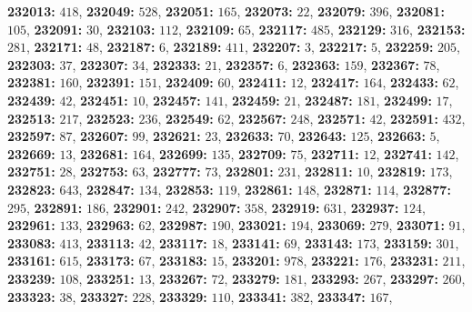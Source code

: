 \textsf{\bfseries 232013:} $418$, \textsf{\bfseries 232049:} $528$, \textsf{\bfseries 232051:} $165$, \textsf{\bfseries 232073:} $22$, \textsf{\bfseries 232079:} $396$, \textsf{\bfseries 232081:} $105$, \textsf{\bfseries 232091:} $30$, \textsf{\bfseries 232103:} $112$, \textsf{\bfseries 232109:} $65$, \textsf{\bfseries 232117:} $485$, \textsf{\bfseries 232129:} $316$, \textsf{\bfseries 232153:} $281$, \textsf{\bfseries 232171:} $48$, \textsf{\bfseries 232187:} $6$, \textsf{\bfseries 232189:} $411$, \textsf{\bfseries 232207:} $3$, \textsf{\bfseries 232217:} $5$, \textsf{\bfseries 232259:} $205$, \textsf{\bfseries 232303:} $37$, \textsf{\bfseries 232307:} $34$, \textsf{\bfseries 232333:} $21$, \textsf{\bfseries 232357:} $6$, \textsf{\bfseries 232363:} $159$, \textsf{\bfseries 232367:} $78$, \textsf{\bfseries 232381:} $160$, \textsf{\bfseries 232391:} $151$, \textsf{\bfseries 232409:} $60$, \textsf{\bfseries 232411:} $12$, \textsf{\bfseries 232417:} $164$, \textsf{\bfseries 232433:} $62$, \textsf{\bfseries 232439:} $42$, \textsf{\bfseries 232451:} $10$, \textsf{\bfseries 232457:} $141$, \textsf{\bfseries 232459:} $21$, \textsf{\bfseries 232487:} $181$, \textsf{\bfseries 232499:} $17$, \textsf{\bfseries 232513:} $217$, \textsf{\bfseries 232523:} $236$, \textsf{\bfseries 232549:} $62$, \textsf{\bfseries 232567:} $248$, \textsf{\bfseries 232571:} $42$, \textsf{\bfseries 232591:} $432$, \textsf{\bfseries 232597:} $87$, \textsf{\bfseries 232607:} $99$, \textsf{\bfseries 232621:} $23$, \textsf{\bfseries 232633:} $70$, \textsf{\bfseries 232643:} $125$, \textsf{\bfseries 232663:} $5$, \textsf{\bfseries 232669:} $13$, \textsf{\bfseries 232681:} $164$, \textsf{\bfseries 232699:} $135$, \textsf{\bfseries 232709:} $75$, \textsf{\bfseries 232711:} $12$, \textsf{\bfseries 232741:} $142$, \textsf{\bfseries 232751:} $28$, \textsf{\bfseries 232753:} $63$, \textsf{\bfseries 232777:} $73$, \textsf{\bfseries 232801:} $231$, \textsf{\bfseries 232811:} $10$, \textsf{\bfseries 232819:} $173$, \textsf{\bfseries 232823:} $643$, \textsf{\bfseries 232847:} $134$, \textsf{\bfseries 232853:} $119$, \textsf{\bfseries 232861:} $148$, \textsf{\bfseries 232871:} $114$, \textsf{\bfseries 232877:} $295$, \textsf{\bfseries 232891:} $186$, \textsf{\bfseries 232901:} $242$, \textsf{\bfseries 232907:} $358$, \textsf{\bfseries 232919:} $631$, \textsf{\bfseries 232937:} $124$, \textsf{\bfseries 232961:} $133$, \textsf{\bfseries 232963:} $62$, \textsf{\bfseries 232987:} $190$, \textsf{\bfseries 233021:} $194$, \textsf{\bfseries 233069:} $279$, \textsf{\bfseries 233071:} $91$, \textsf{\bfseries 233083:} $413$, \textsf{\bfseries 233113:} $42$, \textsf{\bfseries 233117:} $18$, \textsf{\bfseries 233141:} $69$, \textsf{\bfseries 233143:} $173$, \textsf{\bfseries 233159:} $301$, \textsf{\bfseries 233161:} $615$, \textsf{\bfseries 233173:} $67$, \textsf{\bfseries 233183:} $15$, \textsf{\bfseries 233201:} $978$, \textsf{\bfseries 233221:} $176$, \textsf{\bfseries 233231:} $211$, \textsf{\bfseries 233239:} $108$, \textsf{\bfseries 233251:} $13$, \textsf{\bfseries 233267:} $72$, \textsf{\bfseries 233279:} $181$, \textsf{\bfseries 233293:} $267$, \textsf{\bfseries 233297:} $260$, \textsf{\bfseries 233323:} $38$, \textsf{\bfseries 233327:} $228$, \textsf{\bfseries 233329:} $110$, \textsf{\bfseries 233341:} $382$, \textsf{\bfseries 233347:} $167$, 

